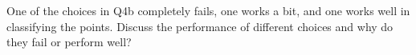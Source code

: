 \item {} 
One of the choices in Q4b completely fails, one works a bit, and one works well in classifying the points.
Discuss the performance of different choices and why do they fail or perform well?

